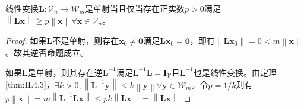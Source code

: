 \documentclass[../main.tex]{subfiles}
\begin{document}
\begin{lemma}\label{thm:inv_func_l1}
    线性变换$\mathbf{L}:\mathcal{V}_n\rightarrow\mathcal{W}_m$是单射当且仅当存在正实数$p>0$满足$\left\|\mathbf{Lx}\right\|\geq p \left\|\mathbf{x}\right\|\forall\mathbf{x}\in\mathcal{V}_n$。
\end{lemma}
\begin{proof}
    如果$\mathbf{L}$不是单射，则存在$\mathbf{x}_0\neq\mathbf{0}$满足$\mathbf{Lx}_0=\mathbf{0}$，即有$\left\|\mathbf{Lx}_0\right\|=0<m\left\|\mathbf{x}\right\|$。故其逆否命题成立。

    如果$\mathbf{L}$是单射，则其存在逆$\mathbf{L}^{-1}$满足$\mathbf{L}^{-1}\mathbf{L}=\mathbf{I}_{\mathcal{V}}$且$\mathbf{L}^{-1}$也是线性变换。由定理\ref{thm:II.4.3}，$\exists k>0, \left\|\mathbf{L}^{-1}\mathbf{y}\right\|\leq k\left\|\mathbf{y}\right\|\forall\mathbf{y}\in\mathcal{W}_m$。令$p=1/k$则有$p\left\|\mathbf{x}\right\|=m\left\|\mathbf{L}^{-1}\mathbf{Lx}\right\|\leq pk\left\|\mathbf{Lx}\right\|=\left\|\mathbf{Lx}\right\|$
\end{proof}
\end{document}
